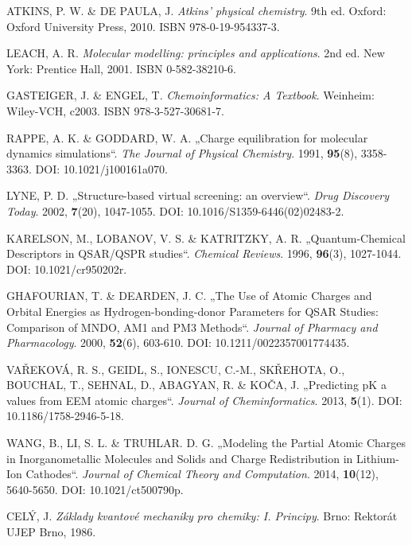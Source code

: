 \begin{thebibliography}{10}

ATKINS, P. W. \& DE PAULA, J. \textit{Atkins' physical chemistry}. 9th ed. Oxford: Oxford University Press, 2010. ISBN 978-0-19-954337-3.

LEACH, A. R. \textit{Molecular modelling: principles and applications}. 2nd ed. New York: Prentice Hall, 2001. ISBN 0-582-38210-6.

GASTEIGER, J. \& ENGEL, T. \textit{Chemoinformatics: A Textbook}. Weinheim: Wiley-VCH, c2003. ISBN 978-3-527-30681-7.

RAPPE, A. K. \& GODDARD, W. A. „Charge equilibration for molecular dynamics simulations“. \textit{The Journal of Physical Chemistry}. 1991, \textbf{95}(8), 3358-3363. DOI: 10.1021/j100161a070.

LYNE, P. D. „Structure-based virtual screening: an overview“. \textit{Drug Discovery Today}. 2002, \textbf{7}(20), 1047-1055. DOI: 10.1016/S1359-6446(02)02483-2.

KARELSON, M., LOBANOV, V. S. \& KATRITZKY, A. R. „Quantum-Chemical Descriptors in QSAR/QSPR studies“. \textit{Chemical Reviews}. 1996, \textbf{96}(3), 1027-1044. DOI: 10.1021/cr950202r.

GHAFOURIAN, T. \& DEARDEN, J. C. „The Use of Atomic Charges and Orbital Energies as Hydrogen-bonding-donor Parameters for QSAR Studies: Comparison of MNDO, AM1 and PM3 Methods“. \textit{Journal of Pharmacy and Pharmacology}. 2000, \textbf{52}(6), 603-610. DOI: 10.1211/0022357001774435.

VAŘEKOVÁ, R. S., GEIDL, S., IONESCU, C.-M., SKŘEHOTA, O., BOUCHAL, T., SEHNAL, D., ABAGYAN, R. \& KOČA, J. „Predicting pK a values from EEM atomic charges“. \textit{Journal of Cheminformatics}. 2013, \textbf{5}(1). DOI: 10.1186/1758-2946-5-18.

WANG, B., LI, S. L. \& TRUHLAR. D. G. „Modeling the Partial Atomic Charges in Inorganometallic Molecules and Solids and Charge Redistribution in Lithium-Ion Cathodes“. \textit{Journal of Chemical Theory and Computation}. 2014, \textbf{10}(12), 5640-5650. DOI: 10.1021/ct500790p.


CELÝ, J. \textit{Základy kvantové mechaniky pro chemiky: I. Principy}. Brno: Rektorát UJEP Brno, 1986.


\end{thebibliography}
